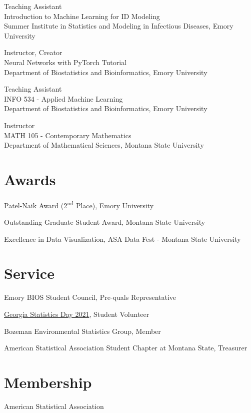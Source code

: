 \documentclass{wm_cv}
\begin{document}
Teaching Assistant \hfill {} \\ 
    \indent \quad Introduction to Machine Learning for ID Modeling \\
   \indent \quad Summer Institute in Statistics and Modeling in Infectious Diseases, Emory University

Instructor, Creator \hfill {} \\ 
    \indent \quad Neural Networks with PyTorch Tutorial \\
   \indent \quad Department of Biostatistics and Bioinformatics, Emory University

Teaching Assistant \hfill {} \\ 
    \indent \quad INFO 534 - Applied Machine Learning  \\
   \indent \quad Department of Biostatistics and Bioinformatics, Emory University

Instructor \hfill {} \\ 
    \indent \quad MATH 105 - Contemporary Mathematics  \\
   \indent \quad Department of Mathematical Sciences, Montana State University


\section{Awards}

Patel-Naik Award (2\textsuperscript{nd} Place), Emory University \hfill {}

Outstanding Graduate Student Award, Montana State University \hfill {}  

Excellence in Data Visualization, ASA Data Fest - Montana State University \hfill  {}



\section{Service}

Emory BIOS Student Council, Pre-quals Representative \hfill  {}

\href{https://www.stat.uga.edu/events/content/2021/georgia-statistics-day-2021}{Georgia Statistics Day 2021}, Student Volunteer \hfill  {}

Bozeman Environmental Statistics Group, Member \hfill  {}

American Statistical Association Student Chapter at Montana State, Treasurer \hfill  {}

\section{Membership}

American Statistical Association \\
\end{document}
